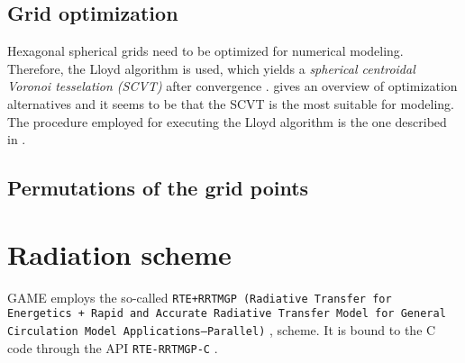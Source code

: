 \documentclass[10pt]{report}
\begin{document}
\section{Grid optimization}
\label{sec:grid_optimization}

Hexagonal spherical grids need to be optimized for numerical modeling. Therefore, the Lloyd algorithm is used, which yields a \textit{spherical centroidal Voronoi tesselation (SCVT)} after convergence \cite{Du2003}. \cite{PEIXOTO201361} gives an overview of optimization alternatives and it seems to be that the SCVT is the most suitable for modeling. The procedure employed for executing the Lloyd algorithm is the one described in \cite{10.1175/MWR2991.1}.

\section{Permutations of the grid points}
\label{sec:permutations_of_the_grid_points}



\chapter{Radiation scheme}
\label{chap:radiation_scheme}

GAME employs the so-called \texttt{RTE+RRTMGP (Radiative Transfer for Energetics + Rapid and Accurate Radiative Transfer Model for General Circulation Model Applications—Parallel)} \cite{doi:10.1029/2019MS001621}, \cite{rte-rrtmgp-github} scheme. It is bound to the C code through the API \texttt{RTE-RRTMGP-C} \cite{rte-rrtmgp-c-github}.

\appendix

\printbibliography
\end{document}
